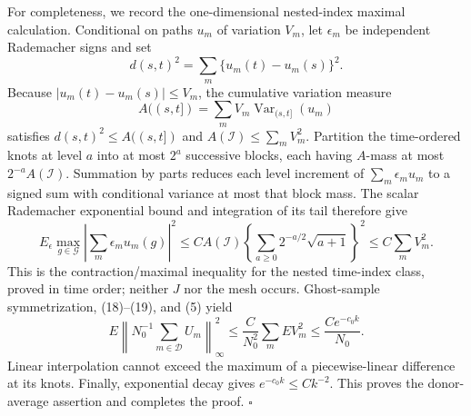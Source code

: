 For completeness, we record the one-dimensional nested-index maximal calculation. Conditional on paths \(u_m\) of variation \(V_m\), let \(\epsilon_m\) be independent Rademacher signs and set
\[
 d(s,t)^2=\sum_m\{u_m(t)-u_m(s)\}^2.
\]
Because \(|u_m(t)-u_m(s)|\le V_m\), the cumulative variation measure
\[
 A((s,t])=\sum_mV_m\operatorname{Var}_{(s,t]}(u_m)
\]
satisfies \(d(s,t)^2\le A((s,t])\) and \(A(\mathcal I)\le\sum_mV_m^2\). Partition the time-ordered knots at level \(a\) into at most \(2^a\) successive blocks, each having \(A\)-mass at most \(2^{-a}A(\mathcal I)\). Summation by parts reduces each level increment of \(\sum_m\epsilon_mu_m\) to a signed sum with conditional variance at most that block mass. The scalar Rademacher exponential bound and integration of its tail therefore give
\[
 E_\epsilon\max_{g\in\mathcal G}\left|\sum_m\epsilon_mu_m(g)\right|^2
 \le C A(\mathcal I)
       \left\{\sum_{a\ge0}2^{-a/2}\sqrt{a+1}\right\}^2
 \le C\sum_mV_m^2.                                      \tag{19}
\]
This is the contraction/maximal inequality for the nested time-index class, proved in time order; neither \(J\) nor the mesh occurs. Ghost-sample symmetrization, (18)--(19), and (5) yield
\[
 E\left\|N_0^{-1}\sum_{m\in\mathcal D}U_m\right\|_\infty^2
 \le\frac{C}{N_0^2}\sum_mEV_m^2
 \le\frac{Ce^{-c_0k}}{N_0}.                              \tag{20}
\]
Linear interpolation cannot exceed the maximum of a piecewise-linear difference at its knots. Finally, exponential decay gives \(e^{-c_0k}\le Ck^{-2}\). This proves the donor-average assertion and completes the proof. \(\square\)